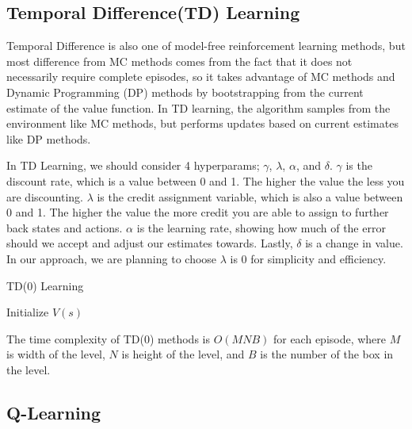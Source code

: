 \documentclass{article}
\begin{document}
\subsection{Temporal Difference(TD) Learning}
Temporal Difference is also one of model-free reinforcement learning methods, but most difference from MC methods comes from the fact that it does not necessarily require complete episodes, so it takes advantage of MC methods and Dynamic Programming (DP) methods by bootstrapping from the current estimate of the value function. In TD learning, the algorithm samples from the environment like MC methods, but performs updates based on current estimates like DP methods.

In TD Learning, we should consider 4 hyperparams; $\gamma$, $\lambda$, $\alpha$, and $\delta$. $\gamma$ is the discount rate, which is a value between 0 and 1. The higher the value the less you are discounting.  $\lambda$ is the credit assignment variable, which is also a value between 0 and 1. The higher the value the more credit you are able to assign to further back states and actions. $\alpha$ is the learning rate, showing how much of the error should we accept and adjust our estimates towards. Lastly, $\delta$ is a change in value. In our approach, we are planning to choose $\lambda$ is 0 for simplicity and efficiency.

\begin{algorithm}[H]
\caption{TD(0) Learning}\label{alg:td}
 Initialize $V(s)$\;
\end{algorithm}

The time complexity of TD(0) methods is $O(MNB)$ for each episode, where $M$ is width of the level, $N$ is height of the level, and $B$ is the number of the box in the level.

\subsection{Q-Learning}
\end{document}
